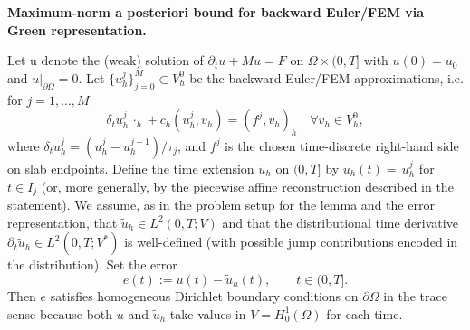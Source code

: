 \documentclass{article}
\begin{document}
\textbf{Maximum-norm a posteriori bound for backward Euler/FEM via Green representation.}

Let u denote the (weak) solution of \(\partial_t u + Mu = F\) on \(\Omega\times(0,T]\) with \(u(0)=u_0\) and \(u|_{\partial\Omega}=0\). Let \(\{u_h^j\}_{j=0}^M\subset V_h^0\) be the backward Euler/FEM approximations, i.e. for \(j=1,\dots,M\)
\[
\delta_t u_h^j\,\cdot_h + c_h(u_h^j,v_h)= (f^j,v_h)_h\quad\forall v_h\in V_h^0,
\]
where \(\delta_t u_h^j=(u_h^j-u_h^{j-1})/\tau_j\), and \(f^j\) is the chosen time-discrete right-hand side on slab endpoints. Define the time extension \(\tilde u_h\) on \((0,T]\) by \(\tilde u_h(t)=\,u_h^j\) for \(t\in I_j\) (or, more generally, by the piecewise affine reconstruction described in the statement). We assume, as in the problem setup for the lemma and the error representation, that \(\tilde u_h\in L^2(0,T;V)\) and that the distributional time derivative \(\partial_t\tilde u_h\in L^2(0,T;V^*)\) is well-defined (with possible jump contributions encoded in the distribution). Set the error
\[
e(t):=u(t)-\tilde u_h(t),\qquad t\in(0,T].
\]
Then \(e\) satisfies homogeneous Dirichlet boundary conditions on \(\partial\Omega\) in the trace sense because both \(u\) and \(\tilde u_h\) take values in \(V=H_0^1(\Omega)\) for each time.
\end{document}
